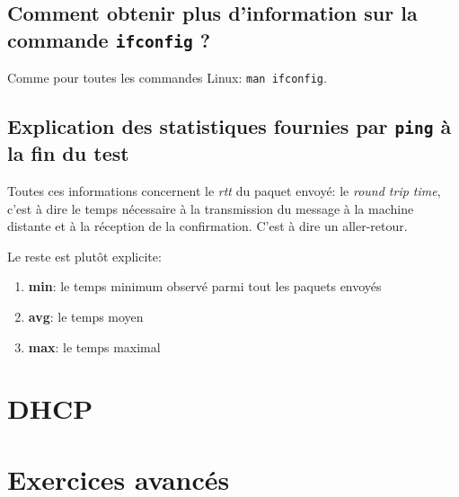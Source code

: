 \documentclass[11pt,a4paper]{article}
\begin{document}
\subsection{Comment obtenir plus d'information sur la commande \texttt{ifconfig} ?}

Comme pour toutes les commandes Linux: \texttt{man ifconfig}.

\subsection{Explication des statistiques fournies par \texttt{ping} à la fin du test}

Toutes ces informations concernent le \textit{rtt} du paquet envoyé: le \textit{round trip time}, c'est à dire le temps nécessaire à la transmission du message à la machine distante et à la réception de la confirmation. C'est à dire un aller-retour.

Le reste est plutôt explicite:
\begin{enumerate}
	\item \textbf{min}: le temps minimum observé parmi tout les paquets envoyés
	\item \textbf{avg}: le temps moyen
	\item \textbf{max}: le temps maximal
\end{enumerate}

\section{DHCP}
\section{Exercices avancés}
\end{document}
